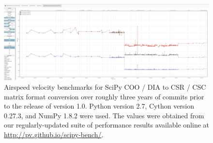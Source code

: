 \documentclass[fleqn,10pt]{wlscirep}
\begin{document}
\begin{figure}[H]
\centering
\includegraphics[width=\textwidth]{supporting_info/asv_bench/sparse/sparse_coo_dia_to_csr_csc}
\caption{Airspeed velocity benchmarks for SciPy COO / DIA to CSR / CSC matrix format conversion over roughly three years of commits prior to the release of version 1.0. Python version 2.7, Cython version 0.27.3, and NumPy 1.8.2 were used. The values were obtained from our regularly-updated suite of performance results available online at \url{http://pv.github.io/scipy-bench/}.}
\label{fig:sparse-conv}
\end{figure}


\end{document}
